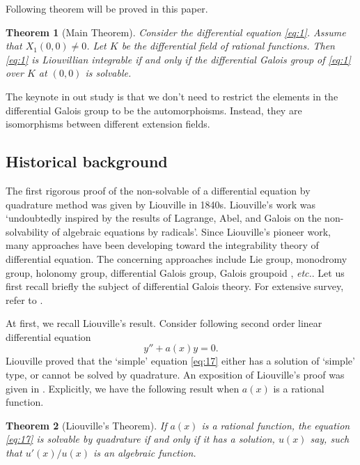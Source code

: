 \documentclass[preprint, 12pt]{elsarticle}
\newtheorem{thm}{Theorem}[section]
\numberwithin{equation}{section}
\begin{document}
Following theorem will be proved in this paper. 

\begin{thm}[Main Theorem]
\label{th:mainthm}
Consider the differential equation \eqref{eq:1}. Assume that $X_1(0,0)\not=0$. 
Let $K$ be the differential field
of rational functions. Then \eqref{eq:1} is Liouvillian integrable if and
only if the differential Galois group of \eqref{eq:1} over $K$ at $(0,0)$
is solvable.
\end{thm}

The keynote in out study is that we don't need to restrict the elements in the differential Galois group to be the automorphoisms. Instead, they are isomorphisms between different extension fields.

\subsection{Historical background}
\label{sec:0.1} 
The first rigorous proof of the non-solvable of a differential equation by quadrature method was given by
Liouville in 1840s\cite{L:41}. Liouville's work was `undoubtedly
inspired by the results of Lagrange, Abel, and Galois on the
non-solvability of algebraic equations by radicals'\cite{Kh:95}.
Since Liouville's pioneer work, many approaches have been
developing toward the integrability theory of differential
equation. The concerning approaches include Lie
group\cite{Olv:99}, monodromy group\cite{Kh:95,Yu:88}, holonomy
group\cite{Ca:00,Ca:01,Ce:98}, differential Galois
group\cite{Ka:76,K:48-2,S:03}, Galois groupoid \cite{Ma:01,
Ma:02}, \textit{etc.}. Let us first recall briefly the subject
of differential Galois theory. For extensive survey, refer to
\cite{Lor:01,S:99}.

At first, we recall Liouville's result. 
Consider following second order linear differential equation
\begin{equation}
\label{eq:17} y'' + a(x) y = 0.
\end{equation}
Liouville proved that the `simple' equation \eqref{eq:17} either
has a solution of `simple' type, or cannot be solved by
quadrature\cite{L:39}. An exposition of Liouville's proof was given in \cite[pp.111-123]{Waston:44}. Explicitly, we have the following result when $a(x)$ is a rational function. 

\begin{thm}[Liouville's Theorem]\cite{L:41}If  $a(x)$ is a rational function, the equation \eqref{eq:17} is solvable by quadrature if and only if it has a solution, $u(x)$ say, such that $u'(x)/u(x)$ is an algebraic
function. 
\end{thm}
\end{document}
